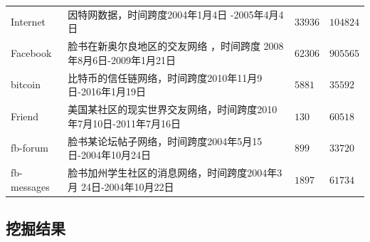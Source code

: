 \begin{table}[!htbp]
{\begin{tabular}{p{70pt}p{250pt}p{55pt}p{40pt}}
			Internet & 因特网\cite{mislove-2009-socialnetworksthesis}数据，时间跨度2004年1月4日 -2005年4月4日& $33936$ & $104824$\\
			Facebook & 脸书在新奥尔良地区的交友网络\cite{viswanath-2009-activity} ，时间跨度 2008年8月6日-2009年1月21日&$62306$& $905565$\\
			bitcoin & 比特币\cite{kumar2016edge}的信任链网络，时间跨度2010年11月9日-2016年1月19日 & $5881$ & $35592$\\
			Friend & 美国某社区的现实世界交友网络\cite{aharony2011social}，时间跨度2010年7月10日-2011年7月16日 & $130$ & $60518$\\
			fb-forum & 脸书某论坛帖子网络\cite{nr}，时间跨度2004年5月15日-2004年10月24日 & $899$ & $33720$\\
			fb-messages & 脸书加州学生社区的消息网络\cite{nr}，时间跨度2004年3月 24日-2004年10月22日 & $1897$ & $61734$\\

			\hline
		\end{tabular}
	}
\end{table}



\subsection{挖掘结果}



